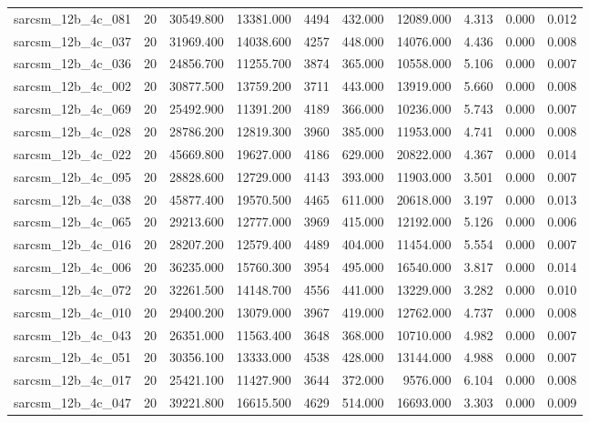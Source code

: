 \begin{tabular}{lrrrrrrrrr}
sarcsm\_12b\_4c\_081 & 20 & 30549.800 & 13381.000 & 4494 & 432.000 & 12089.000 & 4.313 & 0.000 & 0.012 \\
sarcsm\_12b\_4c\_037 & 20 & 31969.400 & 14038.600 & 4257 & 448.000 & 14076.000 & 4.436 & 0.000 & 0.008 \\
sarcsm\_12b\_4c\_036 & 20 & 24856.700 & 11255.700 & 3874 & 365.000 & 10558.000 & 5.106 & 0.000 & 0.007 \\
sarcsm\_12b\_4c\_002 & 20 & 30877.500 & 13759.200 & 3711 & 443.000 & 13919.000 & 5.660 & 0.000 & 0.008 \\
sarcsm\_12b\_4c\_069 & 20 & 25492.900 & 11391.200 & 4189 & 366.000 & 10236.000 & 5.743 & 0.000 & 0.007 \\
sarcsm\_12b\_4c\_028 & 20 & 28786.200 & 12819.300 & 3960 & 385.000 & 11953.000 & 4.741 & 0.000 & 0.008 \\
sarcsm\_12b\_4c\_022 & 20 & 45669.800 & 19627.000 & 4186 & 629.000 & 20822.000 & 4.367 & 0.000 & 0.014 \\
sarcsm\_12b\_4c\_095 & 20 & 28828.600 & 12729.000 & 4143 & 393.000 & 11903.000 & 3.501 & 0.000 & 0.007 \\
sarcsm\_12b\_4c\_038 & 20 & 45877.400 & 19570.500 & 4465 & 611.000 & 20618.000 & 3.197 & 0.000 & 0.013 \\
sarcsm\_12b\_4c\_065 & 20 & 29213.600 & 12777.000 & 3969 & 415.000 & 12192.000 & 5.126 & 0.000 & 0.006 \\
sarcsm\_12b\_4c\_016 & 20 & 28207.200 & 12579.400 & 4489 & 404.000 & 11454.000 & 5.554 & 0.000 & 0.007 \\
sarcsm\_12b\_4c\_006 & 20 & 36235.000 & 15760.300 & 3954 & 495.000 & 16540.000 & 3.817 & 0.000 & 0.014 \\
sarcsm\_12b\_4c\_072 & 20 & 32261.500 & 14148.700 & 4556 & 441.000 & 13229.000 & 3.282 & 0.000 & 0.010 \\
sarcsm\_12b\_4c\_010 & 20 & 29400.200 & 13079.000 & 3967 & 419.000 & 12762.000 & 4.737 & 0.000 & 0.008 \\
sarcsm\_12b\_4c\_043 & 20 & 26351.000 & 11563.400 & 3648 & 368.000 & 10710.000 & 4.982 & 0.000 & 0.007 \\
sarcsm\_12b\_4c\_051 & 20 & 30356.100 & 13333.000 & 4538 & 428.000 & 13144.000 & 4.988 & 0.000 & 0.007 \\
sarcsm\_12b\_4c\_017 & 20 & 25421.100 & 11427.900 & 3644 & 372.000 & 9576.000 & 6.104 & 0.000 & 0.008 \\
sarcsm\_12b\_4c\_047 & 20 & 39221.800 & 16615.500 & 4629 & 514.000 & 16693.000 & 3.303 & 0.000 & 0.009 \\

\end{tabular}
